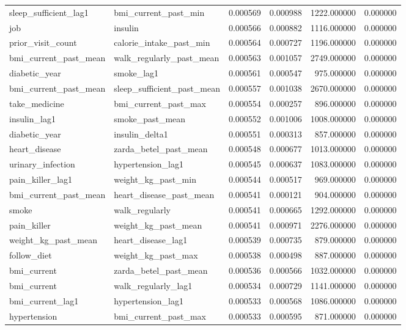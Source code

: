 \begin{longtable}{llrrrr}
sleep\_sufficient\_lag1 & bmi\_current\_past\_min & 0.000569 & 0.000988 & 1222.000000 & 0.000000 \\
job & insulin & 0.000566 & 0.000882 & 1116.000000 & 0.000000 \\
prior\_visit\_count & calorie\_intake\_past\_min & 0.000564 & 0.000727 & 1196.000000 & 0.000000 \\
bmi\_current\_past\_mean & walk\_regularly\_past\_mean & 0.000563 & 0.001057 & 2749.000000 & 0.000000 \\
diabetic\_year & smoke\_lag1 & 0.000561 & 0.000547 & 975.000000 & 0.000000 \\
bmi\_current\_past\_mean & sleep\_sufficient\_past\_mean & 0.000557 & 0.001038 & 2670.000000 & 0.000000 \\
take\_medicine & bmi\_current\_past\_max & 0.000554 & 0.000257 & 896.000000 & 0.000000 \\
insulin\_lag1 & smoke\_past\_mean & 0.000552 & 0.001006 & 1008.000000 & 0.000000 \\
diabetic\_year & insulin\_delta1 & 0.000551 & 0.000313 & 857.000000 & 0.000000 \\
heart\_disease & zarda\_betel\_past\_mean & 0.000548 & 0.000677 & 1013.000000 & 0.000000 \\
urinary\_infection & hypertension\_lag1 & 0.000545 & 0.000637 & 1083.000000 & 0.000000 \\
pain\_killer\_lag1 & weight\_kg\_past\_min & 0.000544 & 0.000517 & 969.000000 & 0.000000 \\
bmi\_current\_past\_mean & heart\_disease\_past\_mean & 0.000541 & 0.000121 & 904.000000 & 0.000000 \\
smoke & walk\_regularly & 0.000541 & 0.000665 & 1292.000000 & 0.000000 \\
pain\_killer & weight\_kg\_past\_mean & 0.000541 & 0.000971 & 2276.000000 & 0.000000 \\
weight\_kg\_past\_mean & heart\_disease\_lag1 & 0.000539 & 0.000735 & 879.000000 & 0.000000 \\
follow\_diet & weight\_kg\_past\_max & 0.000538 & 0.000498 & 887.000000 & 0.000000 \\
bmi\_current & zarda\_betel\_past\_mean & 0.000536 & 0.000566 & 1032.000000 & 0.000000 \\
bmi\_current & walk\_regularly\_lag1 & 0.000534 & 0.000729 & 1141.000000 & 0.000000 \\
bmi\_current\_lag1 & hypertension\_lag1 & 0.000533 & 0.000568 & 1086.000000 & 0.000000 \\
hypertension & bmi\_current\_past\_max & 0.000533 & 0.000595 & 871.000000 & 0.000000 \\

\end{longtable}
